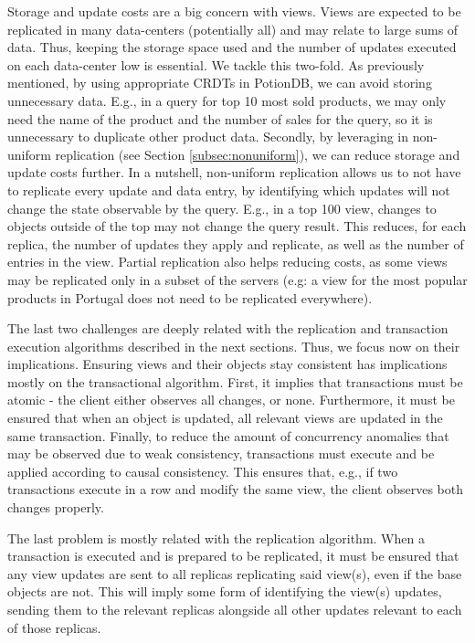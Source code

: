 Storage and update costs are a big concern with views.
Views are expected to be replicated in many data-centers (potentially all) and may relate to large sums of data.
Thus, keeping the storage space used and the number of updates executed on each data-center low is essential.
We tackle this two-fold.
As previously mentioned, by using appropriate CRDTs in PotionDB, we can avoid storing unnecessary data.
E.g., in a query for top 10 most sold products, we may only need the name of the product and the number of sales for the query, so it is unnecessary to duplicate other product data.
Secondly, by leveraging in non-uniform replication (see Section \ref{subsec:nonuniform}), we can reduce storage and update costs further.
In a nutshell, non-uniform replication allows us to not have to replicate every update and data entry, by identifying which updates will not change the state observable by the query.
E.g., in a top 100 view, changes to objects outside of the top may not change the query result.
This reduces, for each replica, the number of updates they apply and replicate, as well as the number of entries in the view.
Partial replication also helps reducing costs, as some views may be replicated only in a subset of the servers (e.g: a view for the most popular products in Portugal does not need to be replicated everywhere).

The last two challenges are deeply related with the replication and transaction execution algorithms described in the next sections.
Thus, we focus now on their implications.
Ensuring views and their objects stay consistent has implications mostly on the transactional algorithm.
First, it implies that transactions must be atomic - the client either observes all changes, or none.
Furthermore, it must be ensured that when an object is updated, all relevant views are updated in the same transaction.
Finally, to reduce the amount of concurrency anomalies that may be observed due to weak consistency, transactions must execute and be applied according to causal consistency.
This ensures that, e.g., if two transactions execute in a row and modify the same view, the client observes both changes properly.

The last problem is mostly related with the replication algorithm.
When a transaction is executed and is prepared to be replicated, it must be ensured that any view updates are sent to all replicas replicating said view(s), even if the base objects are not.
This will imply some form of identifying the view(s) updates, sending them to the relevant replicas alongside all other updates relevant to each of those replicas.

